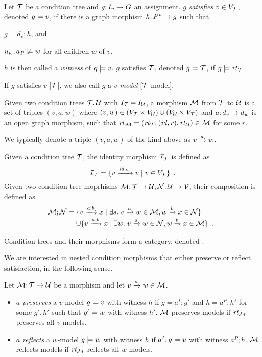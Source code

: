 \begin{definition}[satisfaction]\label{def:satisfaction}
Let ${\mathcal{T}}$ be a condition tree and $g{:}\, I_v\rightarrow G$ an assignment. $g$ \emph{satisfies $v\in V_{\mathcal{T}}$}, denoted $g\models v$, if there is a graph morphism $h{:}\, P^v\rightarrow g$ such that
\begin{inumerate}
\item $g=d_v;h$, and 
\item $u_w;a_P\not\models w$ for all children $w$ of $v$.
\end{inumerate}
$h$ is then called a \emph{witness} of $g\models v$.
$g$ satisfies ${\mathcal{T}}$, denoted $g\models{\mathcal{T}}$, if $g\models\mathit{rt}_{{\mathcal{T}}}$.
\end{definition}
%
If $g$ satisfies $v$ [${\mathcal{T}}$], we also call $g$ a \emph{$v$-model} [${\mathcal{T}}$-model].

\begin{definition}[morphism]
Given two condition trees ${\mathcal{T}},{\mathcal{U}}$ with $I_{\mathcal{T}}=I_{\mathcal{U}}$, a morphism ${\mathcal{M}}$ from ${\mathcal{T}}$ to ${\mathcal{U}}$ is a set of triples $(v,a,w)$ where $(v,w)\in (V_{\mathcal{T}}\times V_{\mathcal{U}})\cup (V_{\mathcal{U}}\times V_{\mathcal{T}})$ and $a{:}\, d_v\rightarrow d_w$ is an open graph morphism, such that $\mathit{rt}_{{\mathcal{M}}}=(\mathit{rt}_{{\mathcal{T}}},({\mathit{id}},r),\mathit{rt}_{{\mathcal{U}}})\in {\mathcal{M}}$ for some $r$.
\end{definition}
%
We typically denote a triple $(v,a,w)$ of the kind above as $v\xrightarrow{a} w$.

Given a condition tree ${\mathcal{T}}$, the identity morphism ${\mathcal{I}}_{\mathcal{T}}$ is defined as
\[ {\mathcal{I}}_{\mathcal{T}} = \{{{v}\xrightarrow{{\mathit{id}}_{d_v}}{v} \mid v\in V_{\mathcal{T}}}\} \enspace. \]
Given two condition tree moprhisms ${\mathcal{M}}{:}\, {\mathcal{T}}\rightarrow {\mathcal{U}},{\mathcal{N}}{:}\, {\mathcal{U}}\rightarrow {\mathcal{V}}$, their composition is defined as
\[ \cM;\cN =
\begin{array}[t]{@{}l}
	\setof{\trip v{a;b}x \mid \exists s\st \trip v a w\in\cM, \trip wbx\in \cN} \\
	\cup \setof{\trip v{a;b}x \mid \exists w\st \trip vaw\in\cN, \trip wbx\in\cM} \enspace.
\end{array}
\]

\begin{proposition}
Condition trees and their morphisms form a category, denoted {\NC}.
\end{proposition}

We are interested in nested condition morphisms that either preserve or reflect satisfaction, in the following sense.

\begin{definition}
Let ${\mathcal{M}}{:}\, {\mathcal{T}}\rightarrow{\mathcal{U}}$ be a morphism and let ${v}\xrightarrow{a}{w}\in{\mathcal{M}}$.
\begin{itemize}[topsep=\smallskipamount]
\item $a$ \emph{preserves} a $v$-model $g\models v$ with witness $h$ if $g=a^I;g'$ and $h=a^P;h'$ for some $g',h'$ such that $g'\models w$ with witness $h'$. ${\mathcal{M}}$ preserves models if $\mathit{rt}_{{\mathcal{M}}}$ preserves all $v$-models.
\item $a$ \emph{reflects} a $w$-model $g\models w$ with witness $h$ if $a^I;g\models v$ with witness $a^P;h$. ${\mathcal{M}}$ reflects models if $\mathit{rt}_{{\mathcal{M}}}$ reflects all $w$-models.
\end{itemize}
\end{definition}

